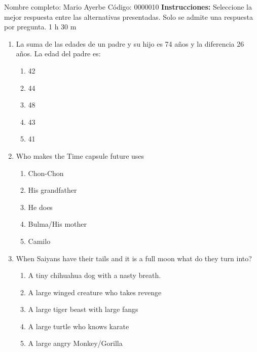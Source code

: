 \documentclass[letterpaper,addpoints,answers,twocolumn,10pt]{exam}
\begin{document}
\noindent Nombre completo: Mario Ayerbe
\newline \newline \newline \newline
Código: 0000010\newline \newline 
{\bf Instrucciones:} Seleccione la mejor respuesta entre las alternativas presentadas. Solo se admite una respuesta por pregunta.
 1 h 30 m

\begin{enumerate}[leftmargin=.2in]




\item  La suma de las edades de un padre y su hijo es 74 años y la diferencia 26 años. La edad del padre es:


\begin{enumerate}[noitemsep,leftmargin=0in]


\item  42
\item  44
\item  48
\item  43
\item  41


\end{enumerate}



\item  Who makes the Time capsule future uses


\begin{enumerate}[noitemsep,leftmargin=0in]


\item  Chon-Chon
\item  His grandfather
\item  He does
\item  Bulma/His mother
\item  Camilo


\end{enumerate}



\item  When Saiyans have their tails and it is a full moon what do they turn into?


\begin{enumerate}[noitemsep,leftmargin=0in]


\item  A tiny chihuahua dog with a nasty breath.
\item  A large winged creature who takes revenge
\item  A large tiger beast with large fangs
\item  A large turtle who knows karate
\item  A large angry Monkey/Gorilla



\end{enumerate}
\end{enumerate}
\end{document}
